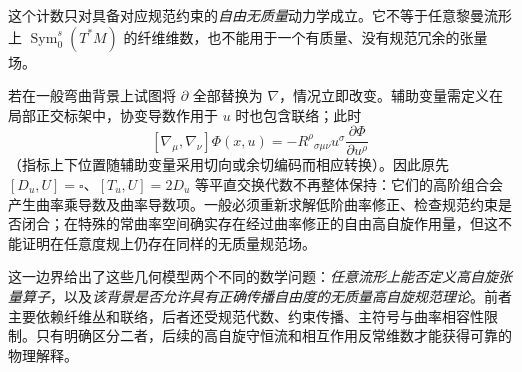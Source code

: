 这个计数只对具备对应规范约束的\emph{自由无质量}动力学成立。它不等于任意黎曼流形上 $\operatorname{Sym}^s_0(T^*M)$ 的纤维维数，也不能用于一个有质量、没有规范冗余的张量场。

若在一般弯曲背景上试图将 $\partial$ 全部替换为 $\nabla$，情况立即改变。辅助变量需定义在局部正交标架中，协变导数作用于 $u$ 时也包含联络；此时
\[
 [\nabla_\mu,\nabla_\nu]\Phi(x,u)
 =-R^\rho{}_{\sigma\mu\nu}
 u^\sigma\frac{\partial\Phi}{\partial u^\rho}
\]
（指标上下位置随辅助变量采用切向或余切编码而相应转换）。因此原先 $[D_u,U]=\square$、$[T_u,U]=2D_u$ 等平直交换代数不再整体保持：它们的高阶组合会产生曲率乘导数及曲率导数项。一般必须重新求解低阶曲率修正、检查规范约束是否闭合；在特殊的常曲率空间确实存在经过曲率修正的自由高自旋作用量，但这不能证明在任意度规上仍存在同样的无质量规范场。

这一边界给出了这些几何模型两个不同的数学问题：\emph{任意流形上能否定义高自旋张量算子}，以及\emph{该背景是否允许具有正确传播自由度的无质量高自旋规范理论}。前者主要依赖纤维丛和联络，后者还受规范代数、约束传播、主符号与曲率相容性限制。只有明确区分二者，后续的高自旋守恒流和相互作用反常维数才能获得可靠的物理解释。


